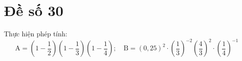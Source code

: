 \onehalfspacing
\section{Đề số 30}

\begin{bt} 
    Thực hiện phép tính:
    $$
    \mathrm{A}=\left(1-\frac{1}{2}\right)\left(1-\frac{1}{3}\right)\left(1-\frac{1}{4}\right) ; \quad \mathrm{B}=(0,25)^2 \cdot\left(\frac{1}{3}\right)^{-2}\left(\frac{4}{3}\right)^2 \cdot\left(\frac{1}{4}\right)^{-1}
    $$
\end{bt}

